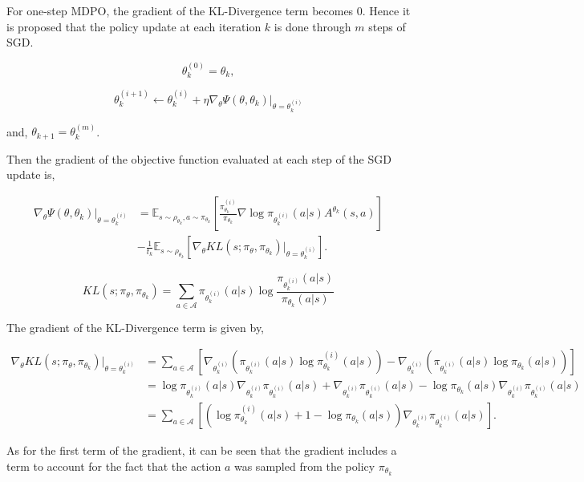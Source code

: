 For one-step MDPO, the gradient of the KL-Divergence term becomes 0. Hence it is proposed that the policy update at each iteration $k$ is done through $m$ steps of SGD.

$${\theta_k^{(0)} = \theta_k},$$

$$\theta_k^{(i+1)} \leftarrow \theta_k^{(i)} + \eta \nabla_{\theta} \Psi(\theta, \theta_k)|_{\theta=\theta_k^{(i)}}$$

and, $\theta_{k+1} = \theta_k^{(m)}$.


Then the gradient of the objective function evaluated at each step of the SGD update is,

\begin{align*}
    \nabla_{\theta} \Psi(\theta, \theta_k)|_{\theta = \theta_k^{(i)}} &=
                    \mathbb{E}_{s \sim \rho_{\theta_k}, a \sim \pi_{\theta_k}}[\frac{\pi_{\theta_k}^{(i)}}{\pi_{\theta_k}} \nabla \log \pi_{\theta_k^{(i)}} (a|s) A^{\theta_k}(s,a)] \\
                    &- \frac{1}{t_k} \mathbb{E}_{s \sim \rho_{\theta_k}}[\nabla_{\theta} KL(s; \pi_{\theta}, \pi_{\theta_k})|_{\theta = \theta_k^{(i)}}].
\end{align*}


$$KL(s; \pi_{\theta}, \pi_{\theta_k}) = \sum_{a \in \mathcal{A}} \pi_{\theta_k^{(i)}}(a|s) \log \frac{\pi_{\theta_k^{(i)}}(a|s)}{\pi_{\theta_k}(a|s)}$$

The gradient of the KL-Divergence term is given by,

\begin{align*}
    \nabla_{\theta} KL(s; \pi_{\theta}, \pi_{\theta_{k}})|_{\theta = \theta_{k}^{(i)}} 
    &= \sum_{a \in \mathcal{A}} [\nabla_{\theta_{k}^{(i)}} (\pi_{\theta_k^{(i)}}(a|s) \log \pi_{\theta_k}^{(i)}(a|s)) - \nabla_{\theta_k^{(i)}} (\pi_{\theta_k^{(i)}}(a|s) \log \pi_{\theta_k}(a|s))] \\
    &= \log \pi_{\theta_k^{(i)}}(a|s) \nabla_{\theta_{k}^{(i)}} \pi_{\theta_k^{(i)}}(a|s) + \nabla_{\theta_{k}^{(i)}} \pi_{\theta_k^{(i)}}(a|s) - \log \pi_{\theta_{k}}(a|s) \nabla_{\theta_{k}^{(i)}} \pi_{\theta_{k}^{(i)}}(a|s)\\
    &= \sum_{a \in \mathcal{A}} [(\log \pi_{\theta_{k}}^{(i)}(a|s) + 1 - \log \pi_{\theta_k}(a|s)) \nabla_{\theta_{k}^{(i)}}{\pi_{\theta_k^{(i)}}}(a|s)].
\end{align*}



As for the first term of the gradient, it can be seen that the gradient includes a term to account for the fact that the action $a$ was sampled from the policy $\pi_{\theta_k}$

